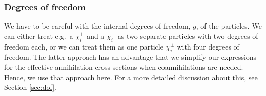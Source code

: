 \subsubsection{Degrees of freedom}

We have to be careful with the internal degrees of freedom, $g$, of
the particles. We can either treat e.g.\ a $\chi_i^+$ and a $\chi_i^-$ as
two separate particles with two degrees of freedom each, or we can
treat them as one particle $\chi_i^\pm$ with four degrees of
freedom. The latter approach has an advantage that we
simplify our expressions for the effective annihilation
cross sections when coannihilations are needed. Hence, we use that
approach here. For a more detailed discussion about this, see Section
\ref{sec:dof}. 
